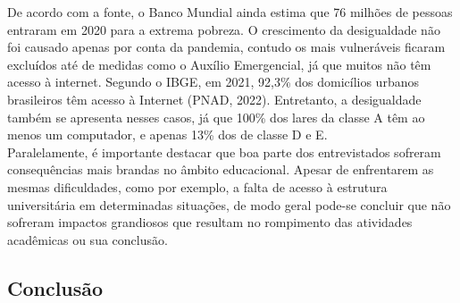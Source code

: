 \documentclass[
]{article}
\begin{document}
De acordo com a fonte, o Banco Mundial ainda estima que 76 milhões de
pessoas entraram em 2020 para a extrema pobreza. O crescimento da
desigualdade não foi causado apenas por conta da pandemia, contudo os
mais vulneráveis ficaram excluídos até de medidas como o Auxílio
Emergencial, já que muitos não têm acesso à internet. Segundo o IBGE, em
2021, 92,3\% dos domicílios urbanos brasileiros têm acesso à Internet
(PNAD, 2022). Entretanto, a desigualdade também se apresenta nesses
casos, já que 100\% dos lares da classe A têm ao menos um computador, e
apenas 13\% dos de classe D e E.\\
Paralelamente, é importante destacar que boa parte dos entrevistados
sofreram consequências mais brandas no âmbito educacional. Apesar de
enfrentarem as mesmas dificuldades, como por exemplo, a falta de acesso
à estrutura universitária em determinadas situações, de modo geral
pode-se concluir que não sofreram impactos grandiosos que resultam no
rompimento das atividades acadêmicas ou sua conclusão.

\hypertarget{conclusuxe3o}{%
\subsection{Conclusão}\label{conclusuxe3o}}
\end{document}
